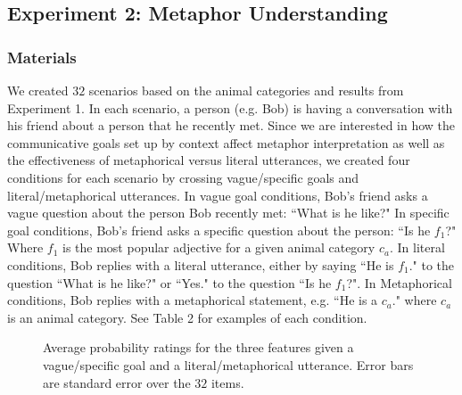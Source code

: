 \documentclass[10pt,letterpaper]{article}
\begin{document}
\subsection{Experiment 2: Metaphor Understanding}
\subsubsection{Materials}
We created $32$ scenarios based on the animal categories and results from Experiment 1. In each scenario, a person (e.g. Bob) is having a conversation with his friend about a person that he recently met. Since we are interested in how the communicative goals set up by context affect metaphor interpretation as well as the effectiveness of metaphorical versus literal utterances, we created four conditions for each scenario by crossing vague/specific goals and literal/metaphorical utterances. In vague goal conditions, Bob's friend asks a vague question about the person Bob recently met: ``What is he like?" In specific goal conditions, Bob's friend asks a specific question about the person: ``Is he $f_1$?" Where $f_1$ is the most popular adjective for a given animal category $c_a$. In literal conditions, Bob replies with a literal utterance, either by saying ``He is $f_1$." to the question ``What is he like?" or ``Yes." to the question ``Is he $f_1$?". In Metaphorical conditions, Bob replies with a metaphorical statement, e.g. ``He is a $c_a$." where $c_a$ is an animal category. See Table 2 for examples of each condition.

\begin{figure}[t]
\begin{center}
\end{center}
\caption{Average probability ratings for the three features given a vague/specific goal and a literal/metaphorical utterance. Error bars are standard error over the $32$ items.} 
\label{human_bar}
\end{figure}
\end{document}
